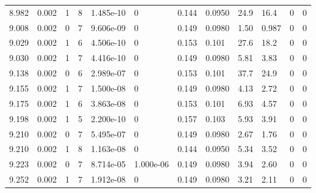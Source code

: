 \documentclass[preview]{standalone}
\begin{document}
{{{{{{{{\begin{tabular}{L{1.2cm}C{1.2cm} C{0.3cm}C{0.5cm} C{1.4cm}C{1.4cm} C{1.4cm}C{1.4cm} C{1.6cm}C{1.6cm} C{1.6cm}C{1.6cm}}
  8.982  &  0.002  & 1     &  8 &  1.485e-10  & 0  &  0.144&   0.0950& 24.9 & 16.4   &  0 & 0  \\ 
  9.008  &  0.002  & 0     &  7 &  9.606e-09  & 0  &  0.149&   0.0980& 1.50 & 0.987   &  0 & 0  \\ 
  9.029  &  0.002  & 1     &  6 &  4.506e-10  & 0  &  0.153&   0.101& 27.6 & 18.2   &  0 & 0  \\ 
  9.030  &  0.002  & 1     &  7 &  4.416e-10  & 0  &  0.149&   0.0980& 5.81 & 3.83   &  0 & 0  \\ 
  9.138  &  0.002  & 0     &  6 &  2.989e-07  & 0  &  0.153&   0.101& 37.7 & 24.9   &  0 & 0  \\ 
  9.155  &  0.002  & 1     &  7 &  1.500e-08  & 0  &  0.149&   0.0980& 4.13 & 2.72   &  0 & 0  \\ 
  9.175  &  0.002  & 1     &  6 &  3.863e-08  & 0  &  0.153&   0.101& 6.93 & 4.57   &  0 & 0  \\ 
  9.198  &  0.002  & 1     &  5 &  2.200e-10  & 0  &  0.157&   0.103& 5.93 & 3.91   &  0 & 0  \\ 
  9.210  &  0.002  & 0     &  7 &  5.495e-07  & 0  &  0.149&   0.0980& 2.67 & 1.76   &  0 & 0  \\ 
  9.210  &  0.002  & 1     &  8 &  1.163e-08  & 0  &  0.144&   0.0950& 5.34 & 3.52   &  0 & 0  \\ 
  9.223  &  0.002  & 0     &  7 &  8.714e-05  & 1.000e-06  &  0.149&   0.0980& 3.94 & 2.60   &  0 & 0  \\ 
  9.252  &  0.002  & 1     &  7 &  1.912e-08  & 0  &  0.149&   0.0980& 3.21 & 2.11   &  0 & 0  \\ 
\hline 
\end{tabular} 

}}}}}}}}
\end{document}
